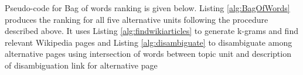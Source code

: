 \documentclass[11pt]{article}
\begin{document}
Pseudo-code for Bag of words ranking is given below. Listing \ref{alg:BagOfWords} produces the ranking for all five alternative units following the procedure described above. It uses Listing \ref{alg:findwikiarticles} to generate k-grams and find relevant Wikipedia pages and Listing \ref{alg:disambiguate} to disambiguate among alternative pages using intersection of words between topic unit and description of disambiguation link for alternative page

%		
%
%
%
\end{document}
